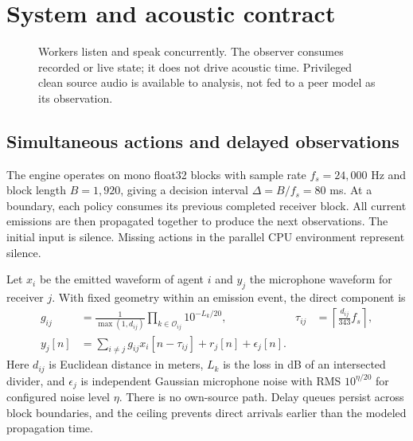 \documentclass{article}
\begin{document}
\section{System and acoustic contract}
\begin{figure}[t]
\centering
{}
\caption{Workers listen and speak concurrently. The observer consumes recorded or live state; it does not drive acoustic time. Privileged clean source audio is available to analysis, not fed to a peer model as its observation.}
\label{fig:system}
\end{figure}

\subsection{Simultaneous actions and delayed observations}
The engine operates on mono float32 blocks with sample rate $f_s=24{,}000$ Hz and block length $B=1{,}920$, giving a decision interval $\Delta=B/f_s=80$ ms. At a boundary, each policy consumes its previous completed receiver block. All current emissions are then propagated together to produce the next observations. The initial input is silence. Missing actions in the parallel CPU environment represent silence.

Let $x_i$ be the emitted waveform of agent $i$ and $y_j$ the microphone waveform for receiver $j$. With fixed geometry within an emission event, the direct component is
\begin{align}
 g_{ij}&=\frac{1}{\max(1,d_{ij})}\prod_{k\in\mathcal{O}_{ij}}10^{-L_k/20}, &
 \tau_{ij}&=\left\lceil\frac{d_{ij}}{343}f_s\right\rceil,\\
 y_j[n]&=\sum_{i\ne j}g_{ij}x_i[n-\tau_{ij}]+r_j[n]+\epsilon_j[n].
\end{align}
Here $d_{ij}$ is Euclidean distance in meters, $L_k$ is the loss in dB of an intersected divider, and $\epsilon_j$ is independent Gaussian microphone noise with RMS $10^{\eta/20}$ for configured noise level $\eta$. There is no own-source path. Delay queues persist across block boundaries, and the ceiling prevents direct arrivals earlier than the modeled propagation time.
\end{document}
